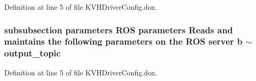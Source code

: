 \-Definition at line 5 of file \-K\-V\-H\-Driver\-Config.\-dox.

\subsubsection[{$\sim$output\-\_\-topic}]{\setlength{\rightskip}{0pt plus 5cm}subsubsection parameters \-R\-O\-S parameters \-Reads and maintains the following parameters on the \-R\-O\-S server b $\sim$output\-\_\-topic}\label{KVHDriverConfig_8dox_adbd4a4870f3a92a60ba5e19b5a08bec8}


\-Definition at line 5 of file \-K\-V\-H\-Driver\-Config.\-dox.


